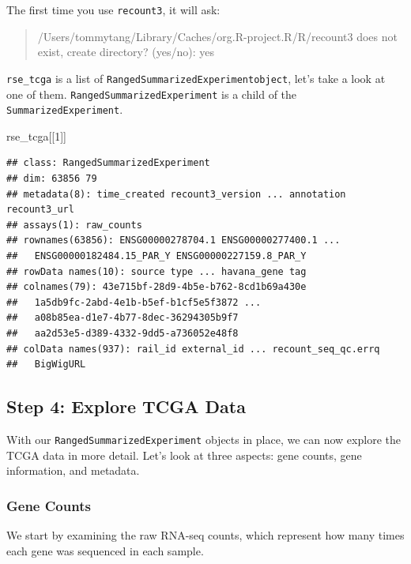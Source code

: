 \documentclass[
]{book}
\newenvironment{Shaded}{\begin{snugshade}}{\end{snugshade}}
\newcommand{\DecValTok}[1]{\textcolor[rgb]{0.00,0.00,0.81}{#1}}
\newcommand{\NormalTok}[1]{#1}
\begin{document}
The first time you use \texttt{recount3}, it will ask:

\begin{quote}
/Users/tommytang/Library/Caches/org.R-project.R/R/recount3 does not exist, create directory? (yes/no): yes
\end{quote}

\texttt{rse\_tcga} is a list of \texttt{RangedSummarizedExperimentobject}, let's take a look at one of them. \texttt{RangedSummarizedExperiment} is a child of the \texttt{SummarizedExperiment}.

\begin{Shaded}
\begin{Highlighting}[]
\NormalTok{rse\_tcga[[}\DecValTok{1}\NormalTok{]]}
\end{Highlighting}
\end{Shaded}

\begin{verbatim}
## class: RangedSummarizedExperiment 
## dim: 63856 79 
## metadata(8): time_created recount3_version ... annotation recount3_url
## assays(1): raw_counts
## rownames(63856): ENSG00000278704.1 ENSG00000277400.1 ...
##   ENSG00000182484.15_PAR_Y ENSG00000227159.8_PAR_Y
## rowData names(10): source type ... havana_gene tag
## colnames(79): 43e715bf-28d9-4b5e-b762-8cd1b69a430e
##   1a5db9fc-2abd-4e1b-b5ef-b1cf5e5f3872 ...
##   a08b85ea-d1e7-4b77-8dec-36294305b9f7
##   aa2d53e5-d389-4332-9dd5-a736052e48f8
## colData names(937): rail_id external_id ... recount_seq_qc.errq
##   BigWigURL
\end{verbatim}

\hypertarget{step-4-explore-tcga-data}{%
\subsection{Step 4: Explore TCGA Data}\label{step-4-explore-tcga-data}}

With our \texttt{RangedSummarizedExperiment} objects in place, we can now explore the TCGA data in more detail. Let's look at three aspects: gene counts, gene information, and metadata.

\hypertarget{gene-counts}{%
\subsubsection{Gene Counts}\label{gene-counts}}

We start by examining the raw RNA-seq counts, which represent how many times each gene was sequenced in each sample.
\end{document}
